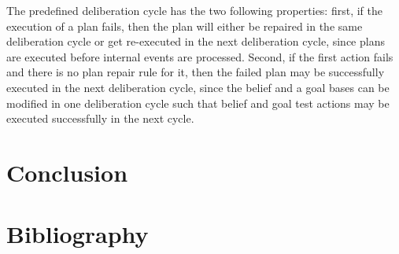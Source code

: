 \documentclass[a4paper]{article}
\begin{document}
The predefined deliberation cycle has the two following properties: first, if the execution of a plan fails, then the plan will either be repaired in the same deliberation cycle or get re-executed in the next deliberation cycle, since plans are executed before internal events are processed. Second, if the first action fails and there is no plan repair rule for it, then the failed plan may be successfully executed in the next deliberation cycle, since the belief and a goal bases can be modified in one deliberation cycle such that belief and goal test actions may be executed successfully in the next cycle.


\section{Conclusion} %


\section{Bibliography}
\nocite{*}


\end{document}
